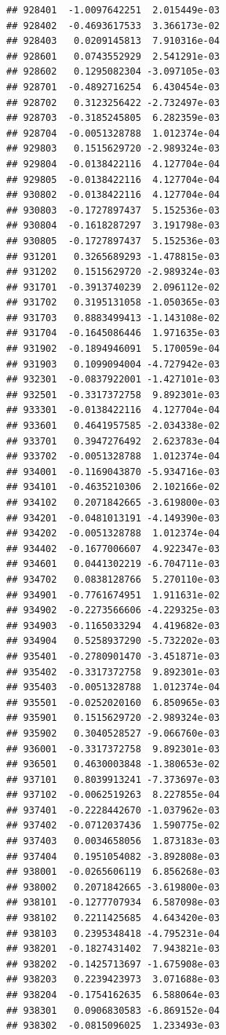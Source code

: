 \begin{frame}[fragile]
\begin{verbatim}
## 928401  -1.0097642251  2.015449e-03
## 928402  -0.4693617533  3.366173e-02
## 928403   0.0209145813  7.910316e-04
## 928601   0.0743552929  2.541291e-03
## 928602   0.1295082304 -3.097105e-03
## 928701  -0.4892716254  6.430454e-03
## 928702   0.3123256422 -2.732497e-03
## 928703  -0.3185245805  6.282359e-03
## 928704  -0.0051328788  1.012374e-04
## 929803   0.1515629720 -2.989324e-03
## 929804  -0.0138422116  4.127704e-04
## 929805  -0.0138422116  4.127704e-04
## 930802  -0.0138422116  4.127704e-04
## 930803  -0.1727897437  5.152536e-03
## 930804  -0.1618287297  3.191798e-03
## 930805  -0.1727897437  5.152536e-03
## 931201   0.3265689293 -1.478815e-03
## 931202   0.1515629720 -2.989324e-03
## 931701  -0.3913740239  2.096112e-02
## 931702   0.3195131058 -1.050365e-03
## 931703   0.8883499413 -1.143108e-02
## 931704  -0.1645086446  1.971635e-03
## 931902  -0.1894946091  5.170059e-04
## 931903   0.1099094004 -4.727942e-03
## 932301  -0.0837922001 -1.427101e-03
## 932501  -0.3317372758  9.892301e-03
## 933301  -0.0138422116  4.127704e-04
## 933601   0.4641957585 -2.034338e-02
## 933701   0.3947276492  2.623783e-04
## 933702  -0.0051328788  1.012374e-04
## 934001  -0.1169043870 -5.934716e-03
## 934101  -0.4635210306  2.102166e-02
## 934102   0.2071842665 -3.619800e-03
## 934201  -0.0481013191 -4.149390e-03
## 934202  -0.0051328788  1.012374e-04
## 934402  -0.1677006607  4.922347e-03
## 934601   0.0441302219 -6.704711e-03
## 934702   0.0838128766  5.270110e-03
## 934901  -0.7761674951  1.911631e-02
## 934902  -0.2273566606 -4.229325e-03
## 934903  -0.1165033294  4.419682e-03
## 934904   0.5258937290 -5.732202e-03
## 935401  -0.2780901470 -3.451871e-03
## 935402  -0.3317372758  9.892301e-03
## 935403  -0.0051328788  1.012374e-04
## 935501  -0.0252020160  6.850965e-03
## 935901   0.1515629720 -2.989324e-03
## 935902   0.3040528527 -9.066760e-03
## 936001  -0.3317372758  9.892301e-03
## 936501   0.4630003848 -1.380653e-02
## 937101   0.8039913241 -7.373697e-03
## 937102  -0.0062519263  8.227855e-04
## 937401  -0.2228442670 -1.037962e-03
## 937402  -0.0712037436  1.590775e-02
## 937403   0.0034658056  1.873183e-03
## 937404   0.1951054082 -3.892808e-03
## 938001  -0.0265606119  6.856268e-03
## 938002   0.2071842665 -3.619800e-03
## 938101  -0.1277707934  6.587098e-03
## 938102   0.2211425685  4.643420e-03
## 938103   0.2395348418 -4.795231e-04
## 938201  -0.1827431402  7.943821e-03
## 938202  -0.1425713697 -1.675908e-03
## 938203   0.2239423973  3.071688e-03
## 938204  -0.1754162635  6.588064e-03
## 938301   0.0906830583 -6.869152e-04
## 938302  -0.0815096025  1.233493e-03

\end{verbatim}
\end{frame}
